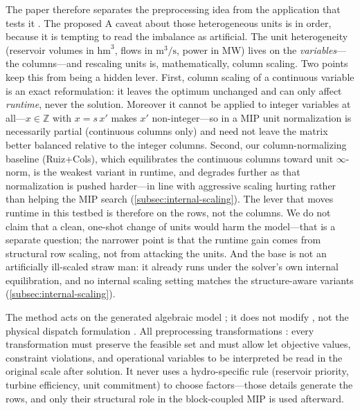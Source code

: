 \documentclass[AMA,Times1COL]{WileyNJDv5} %
\newcommand{\methodRuizCols}{Ruiz+Cols}
\providecommand{\DIFadd}[1]{{\protect\color{blue} \sf #1}} %
\providecommand{\DIFdel}[1]{{\protect\color{red} \scriptsize #1}} %
\providecommand{\DIFaddbegin}{} %
\providecommand{\DIFaddend}{} %
\providecommand{\DIFdelbegin}{} %
\providecommand{\DIFdelend}{} %
\begin{document}
\DIFdelbegin \DIFdel{The paper therefore separates the preprocessing idea from the application that tests it . The proposed }\DIFdelend \DIFaddbegin \DIFadd{A caveat about those heterogeneous units is in order, because it is tempting to read the
imbalance as artificial. The unit heterogeneity (reservoir volumes in $\mathrm{hm}^3$, flows in
$\mathrm{m}^3/\mathrm{s}$, power in MW) lives on the \emph{variables}---the columns---and
rescaling units is, mathematically, column scaling. Two points keep this from being a hidden
lever. First, column scaling of a continuous variable is an exact reformulation: it leaves the
optimum unchanged and can only affect \emph{runtime}, never the solution. Moreover it cannot be
applied to integer variables at all---$x\in\mathbb{Z}$ with $x=s\,x'$ makes $x'$ non-integer---so
in a MIP unit normalization is necessarily partial (continuous columns only) and need not leave the
matrix better balanced relative to the integer columns. Second, our column-normalizing baseline
(\methodRuizCols{}), which equilibrates the continuous columns toward unit $\infty$-norm, is the
weakest variant in runtime, and degrades further as that normalization is pushed harder---in line
with aggressive scaling hurting rather than helping the MIP search (\cref{subsec:internal-scaling}).
The lever that moves runtime in this testbed is therefore on the rows, not the columns. We do not
claim that a clean, one-shot change of units would harm the model---that is a separate question;
the narrower point is that the runtime gain comes from structural row scaling, not from attacking
the units. And the base is not an artificially ill-scaled straw man: it already runs under the
solver's own internal equilibration, and no internal scaling setting matches the structure-aware
variants (\cref{subsec:internal-scaling}).
}

\DIFadd{The }\DIFaddend method acts on the generated algebraic model\DIFdelbegin \DIFdel{; it does not modify }\DIFdelend \DIFaddbegin \DIFadd{, not }\DIFaddend the physical dispatch formulation\DIFdelbegin \DIFdel{. All preprocessing transformations }\DIFdelend \DIFaddbegin \DIFadd{: every transformation }\DIFaddend must preserve the feasible set and \DIFdelbegin \DIFdel{must allow }\DIFdelend \DIFaddbegin \DIFadd{let }\DIFaddend objective values, constraint violations, and operational variables \DIFdelbegin \DIFdel{to be interpreted }\DIFdelend \DIFaddbegin \DIFadd{be read }\DIFaddend in the original scale after solution. \DIFaddbegin \DIFadd{It never uses a hydro-specific rule (reservoir priority, turbine efficiency, unit commitment) to choose factors---those details generate the rows, and only their structural role in the block-coupled MIP is used afterward.
}\DIFaddend 
\end{document}
